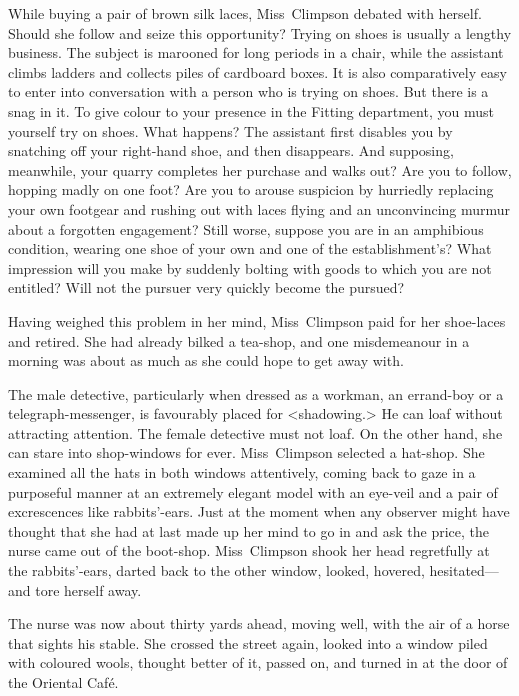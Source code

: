 While buying a pair of brown silk laces, Miss~Climpson debated with herself. Should she follow and seize this opportunity? Trying on shoes is usually a lengthy business. The subject is marooned for long periods in a chair, while the assistant climbs ladders and collects piles of cardboard boxes. It is also comparatively easy to enter into conversation with a person who is trying on shoes. But there is a snag in it. To give colour to your presence in the Fitting department, you must yourself try on shoes. What happens? The assistant first disables you by snatching off your right-hand shoe, and then disappears. And supposing, meanwhile, your quarry completes her purchase and walks out? Are you to follow, hopping madly on one foot? Are you to arouse suspicion by hurriedly replacing your own footgear and rushing out with laces flying and an unconvincing murmur about a forgotten engagement? Still worse, suppose you are in an amphibious condition, wearing one shoe of your own and one of the establishment's? What impression will you make by suddenly bolting with goods to which you are not entitled? Will not the pursuer very quickly become the pursued?

Having weighed this problem in her mind, Miss~Climpson paid for her shoe-laces and retired. She had already bilked a tea-shop, and one misdemeanour in a morning was about as much as she could hope to get away with.

The male detective, particularly when dressed as a workman, an errand-boy or a telegraph-messenger, is favourably placed for <shadowing.> He can loaf without attracting attention. The female detective must not loaf. On the other hand, she can stare into shop-windows for ever. Miss~Climpson selected a hat-shop. She examined all the hats in both windows attentively, coming back to gaze in a purposeful manner at an extremely elegant model with an eye-veil and a pair of excrescences like rabbits'-ears. Just at the moment when any observer might have thought that she had at last made up her mind to go in and ask the price, the nurse came out of the boot-shop. Miss~Climpson shook her head regretfully at the rabbits'-ears, darted back to the other window, looked, hovered, hesitated—and tore herself away.

The nurse was now about thirty yards ahead, moving well, with the air of a horse that sights his stable. She crossed the street again, looked into a window piled with coloured wools, thought better of it, passed on, and turned in at the door of the Oriental Café.

